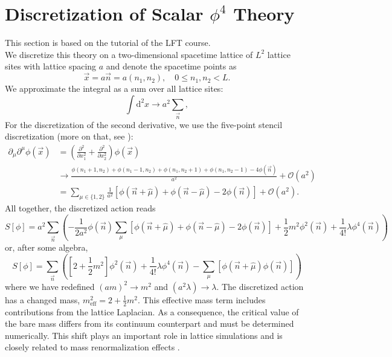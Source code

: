 \section{Discretization of Scalar \texorpdfstring{$\phi^4$}{phi4} Theory}
This section is based on the tutorial of the LFT course. \\
We discretize this theory on a two-dimensional spacetime lattice of $L^2$ lattice sites with lattice spacing $a$ and denote the spacetime points as 
\begin{equation}
    \vec{x} = a \vec{n} = a(n_1, n_2), \quad 0 \leq n_1, n_2 < L. 
\end{equation}
We approximate the integral as a sum over all lattice sites: 
\begin{equation}
    \int \mathrm{d}^{2} x \rightarrow a^{2} \sum_{\vec{n}},
\end{equation}
For the discretization of the second derivative, we use the five-point stencil discretization (more on that, see \cite{FivePointStencilWiki}): 
\begin{equation}
    \begin{aligned}
        \partial_{\mu}\partial^{\mu} \phi(\vec{x}) & = \left( \frac{\partial^{2}}{\partial x_{1}^{2}} + \frac{\partial^{2}}{\partial x_{2}^{2}} \right) \phi(\vec{x}) \\
         & \to \frac{\phi(n_{1} + 1, n_{2}) + \phi(n_{1} - 1, n_{2}) + \phi(n_{1}, n_{2} + 1) + \phi(n_{1}, n_{2} - 1) - 4 \phi(\vec{n})}{a^{2}} + \mathcal{O}(a^{2}) \\
         & = \sum_{\mu \in \{1, 2 \} } \frac{1}{a^{2}} \left[ \phi(\vec{n} + \hat{\mu}) + \phi(\vec{n} - \hat{\mu}) - 2 \phi(\vec{n}) \right] + \mathcal{O}(a^{2}).
    \end{aligned}
\end{equation}
All together, the discretized action reads
\begin{equation}
    S[\phi] = a^{2} \sum_{\vec{n}} \left( -\frac{1}{2 a^{2}} \phi(\vec{n}) \sum_{\mu} \left[ \phi(\vec{n} + \hat{\mu}) + \phi(\vec{n} - \hat{\mu}) - 2 \phi(\vec{n}) \right] + \frac{1}{2} m^{2} \phi^{2}(\vec{n}) + \frac{1}{4!} \lambda \phi^{4}(\vec{n}) \right)
\end{equation}
or, after some algebra,
\begin{equation}
    \boxed{S[\phi] = \sum_{\vec{n}} \left( \left[ 2 + \frac{1}{2} m^{2}\right] \phi^{2}(\vec{n}) + \frac{1}{4!} \lambda \phi^{4}(\vec{n}) -\sum_{\mu} \left[ \phi(\vec{n} + \hat{\mu}) \phi(\vec{n})\right] \right)} \label{eq: discrete_action}
\end{equation}
where we have redefined $(am)^{2} \to m^{2}$ and $(a^{2} \lambda) \to \lambda$. The discretized action has a changed mass, $m_{\text{eff}}^2 = 2 + \frac{1}{2}m^2$. This effective mass term includes contributions from the lattice Laplacian. As a consequence, the critical value of the bare mass differs from its continuum counterpart and must be determined numerically. This shift plays an important role in lattice simulations and is closely related to mass renormalization effects \cite{GattingerLang}. 